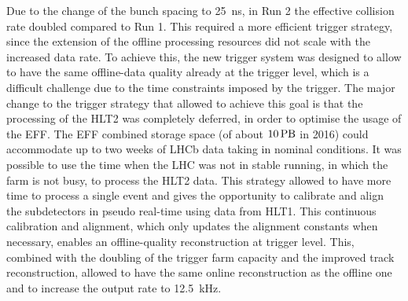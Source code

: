 
Due to the change of the bunch spacing to \SI{25}{\nano\second}, in Run 2 the effective collision rate doubled compared to Run 1. This required a more efficient trigger strategy, since the extension of the offline processing resources did not scale with the increased data rate.
To achieve this, the new trigger system was designed to allow to have the same offline-data quality already at the trigger level, which is a difficult challenge due to the time constraints imposed by the trigger. The major change to the trigger strategy that allowed to achieve this goal is that the processing of the HLT2 was completely deferred, in order to optimise the usage of the EFF. The EFF combined storage space (of about $10 \,\rm PB$ in 2016) could accommodate up to two weeks of LHCb data taking in nominal conditions. It was possible to use the time when the LHC was not in stable running, in which the farm is not busy, to process the HLT2 data. This strategy allowed to have more time to process a single event and gives the opportunity to calibrate and align the subdetectors in pseudo real-time using data from HLT1. This continuous calibration and alignment, which only updates the alignment constants when necessary, enables an offline-quality reconstruction at trigger level. This, combined with the doubling of the trigger farm capacity and the improved track reconstruction, allowed to have the same online reconstruction as the offline one and to increase the output rate to \SI{12.5}{\kilo\hertz}. 

